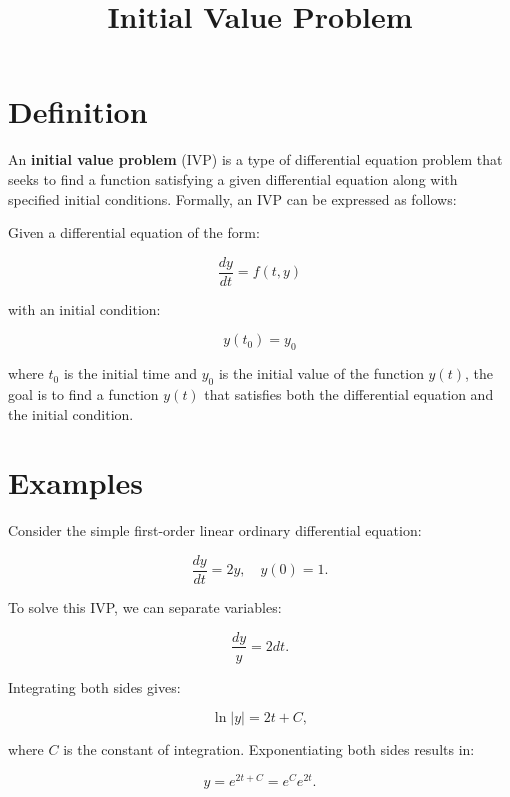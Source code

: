 \documentclass[11pt,a4paper]{article}
\title{Initial Value Problem}
\date{}
\begin{document}
\maketitle
\section{Definition}
An \textbf{initial value problem} (IVP) is a type of differential equation problem that seeks to find a function satisfying a given differential equation along with specified initial conditions. Formally, an IVP can be expressed as follows:

Given a differential equation of the form:

\begin{equation}
\frac{dy}{dt} = f(t, y)
\end{equation}

with an initial condition:

\begin{equation}
y(t_0) = y_0
\end{equation}

where $t_0$ is the initial time and $y_0$ is the initial value of the function $y(t)$, the goal is to find a function $y(t)$ that satisfies both the differential equation and the initial condition.

\section{Examples}
Consider the simple first-order linear ordinary differential equation:

\begin{equation}
\frac{dy}{dt} = 2y, \quad y(0) = 1.
\end{equation}

To solve this IVP, we can separate variables:

\begin{equation}
\frac{dy}{y} = 2 dt.
\end{equation}

Integrating both sides gives:

\begin{equation}
\ln |y| = 2t + C,
\end{equation}

where $C$ is the constant of integration. Exponentiating both sides results in:

\begin{equation}
y = e^{2t + C} = e^C e^{2t}.
\end{equation}
\end{document}
